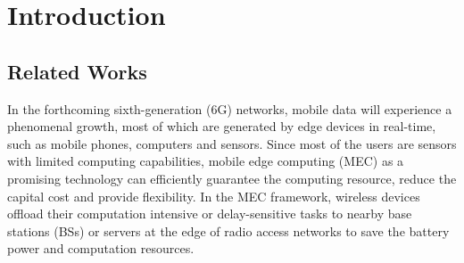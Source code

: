 \documentclass[journal]{IEEEtran}
\begin{document}
%
\IEEEpeerreviewmaketitle

\section{Introduction}
\subsection{Related Works}
%
%
%
%
\IEEEPARstart In the forthcoming sixth-generation (6G) networks, mobile data will experience a phenomenal growth, most of which are generated by edge devices in real-time, such as mobile phones, computers and sensors. Since most of the users are sensors with limited computing capabilities, mobile edge computing (MEC) as a promising technology can efficiently guarantee the computing resource, reduce the capital cost and provide flexibility. In the MEC framework, wireless devices offload their computation intensive or delay-sensitive  tasks to nearby base stations (BSs) or servers at the edge of radio access networks to save the battery power and computation resources\cite{Survey_A,LiH,chen2021communication}.
\end{document}
